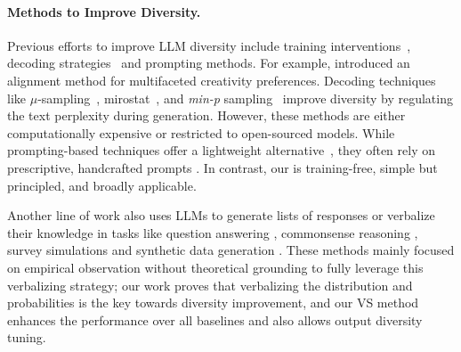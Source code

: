 \paragraph{Methods to Improve Diversity.} Previous efforts to improve LLM diversity include training interventions~\citep{chung2025modifyinglargelanguagemodel, zhou2025bridgingcreativityunderstandinggap}, decoding strategies~\citep{holtzman2020curiouscaseneuraltext,lanchantin2025diversepreferenceoptimization} and prompting methods. For example, \cite{ismayilzada_creative_2025} introduced an alignment method for multifaceted creativity preferences. Decoding techniques like $\mu$-sampling~\citep{hewitt2022truncationsamplinglanguagemodel},  mirostat~\citep{basu2021mirostatneuraltextdecoding}, and \textit{min-p} sampling~\citep{nguyen_turning_2025} improve diversity by regulating the text perplexity during generation. 
However, these methods are either computationally expensive or restricted to open-sourced models. While prompting-based techniques offer a lightweight alternative~\citep{SummersStay2023BrainstormTS, mehrotra2024enhancingcreativitylargelanguage, tian2025macgyverlargelanguagemodels}, they often rely on prescriptive, handcrafted prompts \citep{zhang2024improvingdiversitycommonsensegeneration, shurofry2024growingtailincreasingoutput, ge2025scalingsyntheticdatacreation, lu2025benchmarkinglanguagemodelcreativity, wong2024simplestratdiversifyinglanguagemodel}. 
In contrast, our \ourslower is training-free, simple but principled, and broadly applicable.


Another line of work also uses LLMs to generate lists of responses or verbalize their knowledge in tasks like question answering \citep{tian_just_2023, xiong_can_2024,tao2024trust}, commonsense reasoning \citep{zhang2024improving}, survey simulations \citep{meister_benchmarking_2024} and synthetic data generation \citep{wang2023self, si2024can}. These methods mainly focused on empirical observation without theoretical grounding to fully leverage this verbalizing strategy; %
our work proves that verbalizing the distribution and probabilities is the key towards diversity improvement, and our VS method enhances the performance over all baselines and also allows output diversity tuning. %

